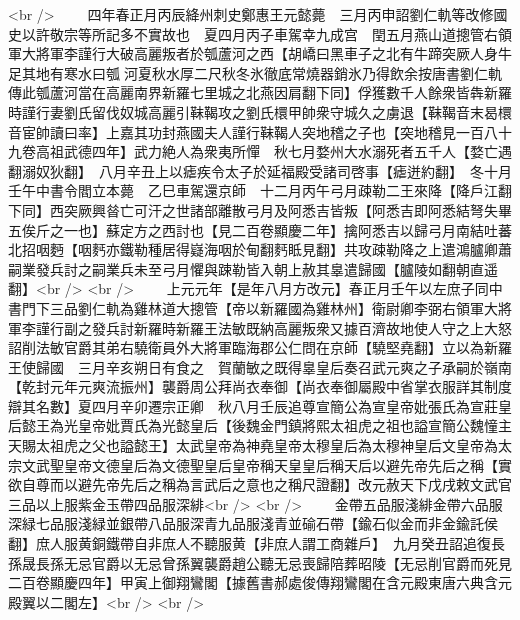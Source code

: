 <br />
　　四年春正月丙辰絳州刺史鄭惠王元懿薨　三月丙申詔劉仁軌等改修國史以許敬宗等所記多不實故也　夏四月丙子車駕幸九成宫　閏五月燕山道摠管右領軍大將軍李謹行大破高麗叛者於瓠蘆河之西【胡嶠曰黑車子之北有牛蹄突厥人身牛足其地有寒水曰瓠河夏秋水厚二尺秋冬氷徹底常燒器銷氷乃得飲余按唐書劉仁軌傳此瓠蘆河當在高麗南界新羅七里城之北燕因肩翻下同】俘獲數千人餘衆皆犇新羅時謹行妻劉氏留伐奴城高麗引靺鞨攻之劉氏檈甲帥衆守城久之虜退【靺鞨音末曷檈音宦帥讀曰率】上嘉其功封燕國夫人謹行靺鞨人突地稽之子也【突地稽見一百八十九卷高祖武德四年】武力絶人為衆夷所憚　秋七月婺州大水溺死者五千人【婺亡遇翻溺奴狄翻】　八月辛丑上以瘧疾令太子於延福殿受諸司啓事【瘧迸約翻】　冬十月壬午中書令閻立本薨　乙巳車駕還京師　十二月丙午弓月疎勒二王來降【降戶江翻下同】西突厥興㫺亡可汗之世諸部離散弓月及阿悉吉皆叛【阿悉吉即阿悉結弩失畢五俟斤之一也】蘇定方之西討也【見二百卷顯慶二年】擒阿悉吉以歸弓月南結吐蕃北招咽麪【咽麫亦鐵勒種居得嶷海咽於甸翻麫眡見翻】共攻疎勒降之上遣鴻臚卿蕭嗣業發兵討之嗣業兵未至弓月懼與踈勒皆入朝上赦其辠遣歸國【臚陵如翻朝直遥翻】<br />
<br />
　　上元元年【是年八月方改元】春正月壬午以左庶子同中書門下三品劉仁軌為雞林道大摠管【帝以新羅國為雞林州】衛尉卿李弼右領軍大將軍李謹行副之發兵討新羅時新羅王法敏既納高麗叛衆又據百濟故地使人守之上大怒詔削法敏官爵其弟右驍衛員外大將軍臨海郡公仁問在京師【驍堅堯翻】立以為新羅王使歸國　三月辛亥朔日有食之　賀蘭敏之既得辠皇后奏召武元爽之子承嗣於嶺南【乾封元年元爽流振州】襲爵周公拜尚衣奉御【尚衣奉御屬殿中省掌衣服詳其制度辯其名數】夏四月辛卯遷宗正卿　秋八月壬辰追尊宣簡公為宣皇帝妣張氏為宣莊皇后懿王為光皇帝妣賈氏為光懿皇后【後魏金門鎮將熙太祖虎之祖也謚宣簡公魏憧主天賜太祖虎之父也謚懿王】太武皇帝為神堯皇帝太穆皇后為太穆神皇后文皇帝為太宗文武聖皇帝文德皇后為文德聖皇后皇帝稱天皇皇后稱天后以避先帝先后之稱【實欲自尊而以避先帝先后之稱為言武后之意也之稱尺證翻】改元赦天下戊戌敕文武官三品以上服紫金玉帶四品服深緋<br />
<br />
　　金帶五品服淺緋金帶六品服深緑七品服淺緑並銀帶八品服深青九品服淺青並䃋石帶【鍮石似金而非金鍮託侯翻】庶人服黄銅鐵帶自非庶人不聽服黄【非庶人謂工商雜戶】　九月癸丑詔追復長孫晟長孫无忌官爵以无忌曾孫翼襲爵趙公聽无忌喪歸陪葬昭陵【无忌削官爵而死見二百卷顯慶四年】甲寅上御翔鸞閣【據舊書郝處俊傳翔鸞閣在含元殿東唐六典含元殿翼以二閣左】<br />
<br />
